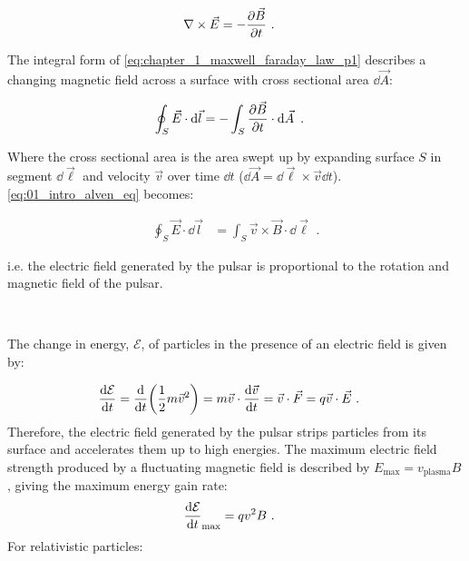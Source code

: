  \begin{equation}
    \begin{aligned}
    \nabla \times \vec{E} &= -\pdv{\vec{B}}{t}\text{ .}
    \end{aligned} \label{eq:chapter_1_maxwell_faraday_law_p1}
\end{equation}

\noindent The integral form of \autoref{eq:chapter_1_maxwell_faraday_law_p1} describes a changing magnetic field across a surface with cross sectional area  $\dd{\vec{A}}$:

\begin{equation}
    \begin{aligned}
    \oint_S \vec{E}\cdot \dd{\vec{l}}&=-\int_S \pdv{\vec{B}}{t} \cdot \dd{\vec{A}}\text{ .}
    \end{aligned} \label{eq:01_intro_alven_eq}
\end{equation}

\noindent Where the cross sectional area is the area swept up by expanding surface $S$ in segment $\dd{\vec{\ell}}$ and velocity $\vec{v}$ over time $\dd{t}$ ($\dd{\vec{A}}=\dd{\vec{\ell}}\times \vec{v}\dd{t}$). \autoref{eq:01_intro_alven_eq} becomes: 

\begin{equation}
    \begin{aligned}
    \oint_S \vec{E}\cdot \dd{\vec{l}}&=\int_S \vec{v}\times \vec{B}\cdot \dd{\vec{\ell}}\text{ .}
    \end{aligned} \label{eq:chapter_1_maxwell_faraday_law_p2}
\end{equation}

\noindent i.e. the electric field generated by the pulsar is proportional to the rotation and magnetic field of the pulsar. 
\par~\par 
The change in energy, $\mathcal{E}$, of particles in the presence of an electric field is given by:

\begin{equation}
    \begin{aligned}
    \dv{\mathcal{E}}{t}&=\dv{}{t} \qty(\frac{1}{2} m\vec{v}^2) = m \vec{v} \cdot \dv{\vec{v}}{t} = \vec{v} \cdot \vec{F} = q\vec{v} \cdot \vec{E}\text{ .}
    \end{aligned} \label{eq:chapter_1_gain_energy_fields}
\end{equation}
\noindent Therefore, the electric field generated by the pulsar strips particles from its surface and accelerates them up to high energies. The maximum electric field strength produced by a fluctuating magnetic field is described by $E_\text{max}=v_\text{plasma}B$, giving the maximum energy gain rate:
\begin{equation}
    \begin{aligned}
    \dv{\mathcal{E}}{t}_\text{max}&=qv^2B\text{ .}
    \end{aligned}
\end{equation}
\noindent For relativistic particles:

